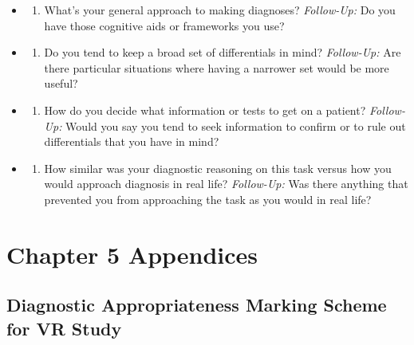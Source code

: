 \documentclass[a4paper, nobind]{templates/ociamthesis}
\providecommand{\tightlist}{%
  \setlength{\itemsep}{0pt}\setlength{\parskip}{0pt}}
\begin{document}
\begin{itemize}
\tightlist
\item
  \begin{enumerate}
  \def\labelenumi{\arabic{enumi}.}
  \tightlist
  \item
    What's your general approach to making diagnoses? \emph{Follow-Up:} Do you have those cognitive aids or frameworks you use?
  \end{enumerate}
\item
  \begin{enumerate}
  \def\labelenumi{\arabic{enumi}.}
  \setcounter{enumi}{1}
  \tightlist
  \item
    Do you tend to keep a broad set of differentials in mind? \emph{Follow-Up:} Are there particular situations where having a narrower set would be more useful?
  \end{enumerate}
\item
  \begin{enumerate}
  \def\labelenumi{\arabic{enumi}.}
  \setcounter{enumi}{2}
  \tightlist
  \item
    How do you decide what information or tests to get on a patient? \emph{Follow-Up:} Would you say you tend to seek information to confirm or to rule out differentials that you have in mind?
  \end{enumerate}
\item
  \begin{enumerate}
  \def\labelenumi{\arabic{enumi}.}
  \setcounter{enumi}{3}
  \tightlist
  \item
    How similar was your diagnostic reasoning on this task versus how you would approach diagnosis in real life? \emph{Follow-Up:} Was there anything that prevented you from approaching the task as you would in real life?
  \end{enumerate}
\end{itemize}

\newpage

\chapter{Chapter 5 Appendices}\label{chapter-5-appendices}

\section{Diagnostic Appropriateness Marking Scheme for VR Study}\label{diagnostic-appropriateness-marking-scheme-for-vr-study}
\end{document}
